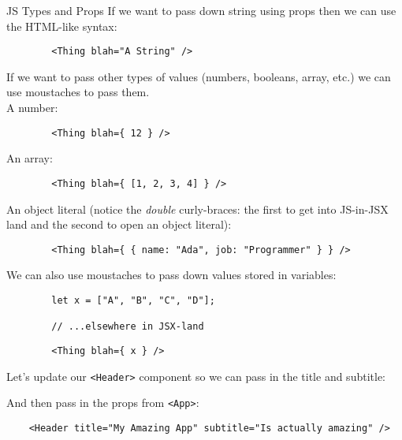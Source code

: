 \begin{infobox}{JS Types and Props}
    If we want to pass down string using props then we can use the HTML-like syntax:

    \begin{verbatim}
        <Thing blah="A String" />
    \end{verbatim}

    If we want to pass other types of values (numbers, booleans, array, etc.) we can use moustaches to pass them.
    \\

    A number:

    \begin{verbatim}
        <Thing blah={ 12 } />
    \end{verbatim}

    An array:

    \begin{verbatim}
        <Thing blah={ [1, 2, 3, 4] } />
    \end{verbatim}

    An object literal (notice the \textit{double} curly-braces: the first to get into JS-in-JSX land and the second to open an object literal):

    \begin{verbatim}
        <Thing blah={ { name: "Ada", job: "Programmer" } } />
    \end{verbatim}

    We can also use moustaches to pass down values stored in variables:

    \begin{verbatim}
        let x = ["A", "B", "C", "D"];

        // ...elsewhere in JSX-land
    \end{verbatim}
    \begin{verbatim}
        <Thing blah={ x } />
    \end{verbatim}
\end{infobox}


\pagebreak


Let's update our \texttt{<Header>} component so we can pass in the title and subtitle:


And then pass in the props from \texttt{<App>}:

\begin{verbatim}
    <Header title="My Amazing App" subtitle="Is actually amazing" />
\end{verbatim}



